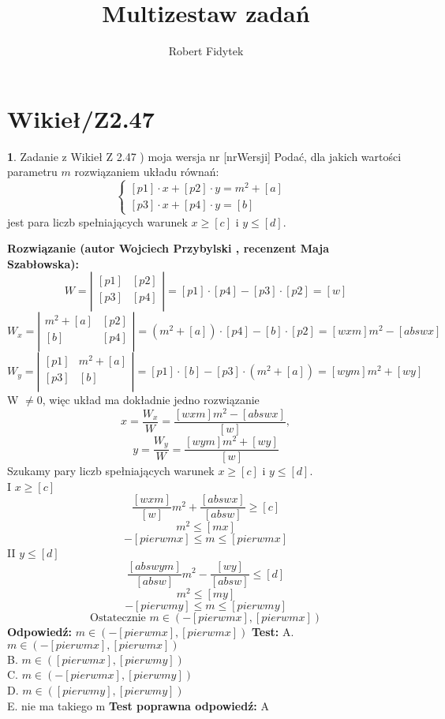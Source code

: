 \documentclass[12pt, a4paper]{article}
\title{Multizestaw zadań}
\author{Robert Fidytek}
\date{}
\theoremstyle{definition} %
\newtheorem{zad}{}
\newcommand{\kategoria}[1]{\section{#1}} %
\newcommand{\zadStart}[1]{\begin{zad}#1\newline} %
\newcommand{\zadStop}{\end{zad}}   %
\newcommand{\rozwStart}[2]{\noindent \textbf{Rozwiązanie (autor #1 , recenzent #2): }\newline} %
\newcommand{\rozwStop}{\newline}                                            %
\newcommand{\odpStart}{\noindent \textbf{Odpowiedź:}\newline}    %
\newcommand{\odpStop}{\newline}                                             %
\newcommand{\testStart}{\noindent \textbf{Test:}\newline} %
\newcommand{\testStop}{\newline} %
\newcommand{\kluczStart}{\noindent \textbf{Test poprawna odpowiedź:}\newline} %
\newcommand{\kluczStop}{\newline} %
\begin{document}
\maketitle


\kategoria{Wikieł/Z2.47}
\zadStart{Zadanie z Wikieł Z 2.47 ) moja wersja nr [nrWersji]}
Podać, dla jakich wartości parametru $m$ rozwiązaniem układu równań:
$$
 \left\{ \begin{array}{ll}
[p1]\cdot x+[p2]\cdot y=m^{2}+[a] & \\
{[p3]}\cdot x+[p4]\cdot y=[b]  & 
\end{array} \right.
$$
jest para liczb spełniających warunek $x\geq [c]$ i $y\leq[d]$.
\zadStop
\rozwStart{Wojciech Przybylski}{Maja Szabłowska}
$$
W =
\left| \begin{array}{ccc}
[p1] & [p2]  \\
{[p3]} & [p4]  \\
\end{array} \right| =[p1]\cdot[p4]-[p3]\cdot[p2]=[w]
$$
$$
W_{x} =
\left| \begin{array}{ccc}
m^{2}+[a] & [p2]  \\
{[b]} & [p4]  \\
\end{array} \right| =(m^{2}+[a])\cdot[p4]-[b]\cdot[p2]=[wxm]m^{2}-[abswx]
$$
$$
W_{y} =
\left| \begin{array}{ccc}
[p1] & m^{2}+[a] \\
{[p3]} & [b]  \\
\end{array} \right| =[p1]\cdot[b]-[p3]\cdot(m^{2}+[a])=[wym]m^{2}+[wy]
$$
W $\neq 0$, więc układ ma dokładnie jedno rozwiązanie
$$x=\frac{W_{x}}{W}=\frac{[wxm]m^{2}-[abswx]}{[w]},$$
$$y=\frac{W_{y}}{W}=\frac{[wym]m^{2}+[wy]}{[w]}$$
Szukamy pary liczb  spełniających warunek $x\geq [c]$ i $y\leq[d]$.\\
I $x\geq [c]$
$$\frac{[wxm]}{[w]}m^{2}+\frac{[abswx]}{[absw]}\geq[c]$$
$$m^{2}\leq[mx]$$
$$-[pierwmx]\leq m\leq[pierwmx]$$
II $y\leq[d]$
$$\frac{[abswym]}{[absw]}m^2-\frac{[wy]}{[absw]}\leq[d]$$
$$m^{2}\leq[my]$$
$$-[pierwmy]\leq m\leq[pierwmy]$$
$$\mbox{Ostatecznie }m\in(-[pierwmx],[pierwmx])$$
\rozwStop
\odpStart
$m\in(-[pierwmx],[pierwmx])$
\odpStop
\testStart
A. $m\in(-[pierwmx],[pierwmx])$\\
B. $m\in([pierwmx],[pierwmy])$\\
C. $m\in(-[pierwmx],[pierwmy])$\\
D. $m\in([pierwmy],[pierwmy])$\\
E. nie ma takiego m 
\testStop
\kluczStart
A
\kluczStop
\end{document}
